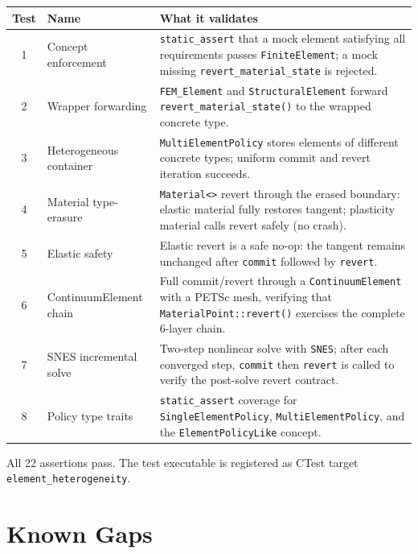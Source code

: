 \begin{center}
\small
\begin{tabular}{clp{7cm}}
\toprule
\textbf{Test} & \textbf{Name} & \textbf{What it validates} \\
\midrule
1 & Concept enforcement &
    \texttt{static\_assert} that a mock element satisfying all
    requirements passes \texttt{FiniteElement}; a mock missing
    \texttt{revert\_material\_state} is rejected. \\
2 & Wrapper forwarding &
    \texttt{FEM\_Element} and \texttt{StructuralElement} forward
    \texttt{revert\_material\_state()} to the wrapped concrete type. \\
3 & Heterogeneous container &
    \texttt{MultiElementPolicy} stores elements of different concrete
    types; uniform commit and revert iteration succeeds. \\
4 & Material type-erasure &
    \texttt{Material<>} revert through the erased boundary: elastic
    material fully restores tangent; plasticity material calls revert
    safely (no crash). \\
5 & Elastic safety &
    Elastic revert is a safe no-op: the tangent remains unchanged
    after \texttt{commit} followed by \texttt{revert}. \\
6 & ContinuumElement chain &
    Full commit/revert through a \texttt{ContinuumElement} with
    a PETSc mesh, verifying that \texttt{MaterialPoint::revert()}
    exercises the complete 6-layer chain. \\
7 & SNES incremental solve &
    Two-step nonlinear solve with \texttt{SNES}; after each
    converged step, \texttt{commit} then \texttt{revert} is called
    to verify the post-solve revert contract. \\
8 & Policy type traits &
    \texttt{static\_assert} coverage for
    \texttt{SingleElementPolicy}, \texttt{MultiElementPolicy},
    and the \texttt{ElementPolicyLike} concept. \\
\bottomrule
\end{tabular}
\end{center}

All 22 assertions pass.  The test executable is registered as CTest
target \texttt{element\_heterogeneity}.

\section{Known Gaps}
\label{sec:phase2-gaps}

